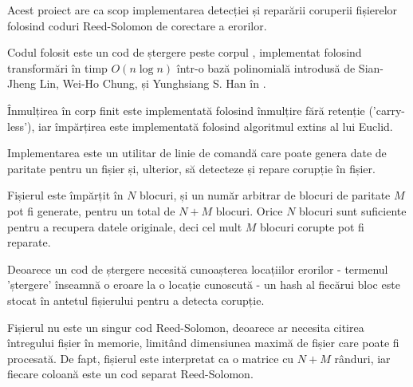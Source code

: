 \begin{abstractpage}

\begin{rezumat}

\indent

Acest proiect are ca scop implementarea detecției și reparării coruperii fișierelor folosind coduri Reed-Solomon de corectare a erorilor.

Codul folosit este un cod de ștergere peste corpul , implementat folosind transformări în timp $O(n \log n)$ într-o bază polinomială introdusă de Sian-Jheng Lin, Wei-Ho Chung, și Yunghsiang S. Han în \cite{novel-poly}.

Înmulțirea în corp finit este implementată folosind înmulțire fără retenție ('carry-less'), iar împărțirea este implementată folosind algoritmul extins al lui Euclid.

Implementarea este un utilitar de linie de comandă care poate genera date de paritate pentru un fișier și, ulterior, să detecteze și repare corupție în fișier.

Fișierul este împărțit în $N$ blocuri, și un număr arbitrar de blocuri de paritate $M$ pot fi generate, pentru un total de $N + M$ blocuri.
Orice $N$ blocuri sunt suficiente pentru a recupera datele originale, deci cel mult $M$ blocuri corupte pot fi reparate.

Deoarece un cod de ștergere necesită cunoașterea locațiilor erorilor - termenul 'ștergere' înseamnă o eroare la o locație cunoscută - un hash al fiecărui bloc este stocat în antetul fișierului pentru a detecta corupție.

Fișierul nu este un singur cod Reed-Solomon, deoarece ar necesita citirea întregului fișier în memorie, limitând dimensiunea maximă de fișier care poate fi procesată.
De fapt, fișierul este interpretat ca o matrice cu $N + M$ rânduri, iar fiecare coloană este un cod separat Reed-Solomon.

\end{rezumat}

\end{abstractpage}
